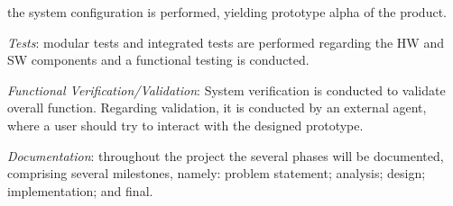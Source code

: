 \begin{item-c}
  the system configuration is performed, yielding prototype alpha of the product.
%
\item \emph{Tests}: modular tests and integrated tests are performed regarding
  the HW and SW components and a functional testing is conducted.
\item \emph{Functional Verification/Validation}: System verification is
  conducted to validate overall function. Regarding validation, it is conducted
  by an external agent, where a user should try to interact with the designed prototype.
\item \emph{Documentation}: throughout the project the several phases will be
  documented, comprising several milestones, namely: problem statement; analysis; design; implementation; and
  final.
\end{item-c}
